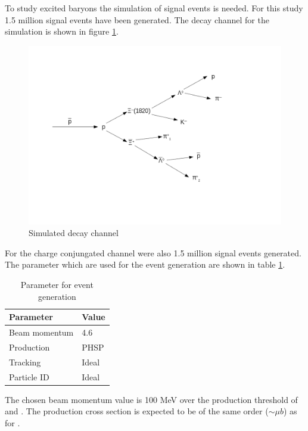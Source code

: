 To study excited \cascade baryons the simulation of signal events is needed.
For this study 1.5 million signal events have been generated.
The decay channel for the simulation is shown in figure \ref{fig:eventgeneration_decaychannel}. 

\begin{figure}[htbp]
	\centering
			\includegraphics[width=1.00\textwidth]{./plots/DecayChannelXi1820.png}
	\caption{Simulated decay channel}
	\label{fig:eventgeneration_decaychannel}
\end{figure}

For the charge conjungated channel were also 1.5 million signal events generated.
The parameter which are used for the event generation are shown in table \ref{tab:eventgeneration_parameter}.

\begin{table}[htbp]
	\caption{Parameter for event generation}
	\label{tab:eventgeneration_parameter}
	\centering
	\begin{tabular}{ll}
		\hline
		Parameter & Value \\
		\hline
		\hline
		Beam momentum & 4.6 \massunit \\
		Production & PHSP \\
		Tracking & Ideal \\
		Particle ID & Ideal \\\hline
		 
	\end{tabular}
\end{table}

The chosen beam momentum value is 100 MeV over the production threshold of \excitedcascade and \anticascade.
The production cross section is expected to be of the same order ($\sim \mu\unit{b}$) as for \cascade \cite{PANDAphysics2009}.\\
\vspace{11pt} 

